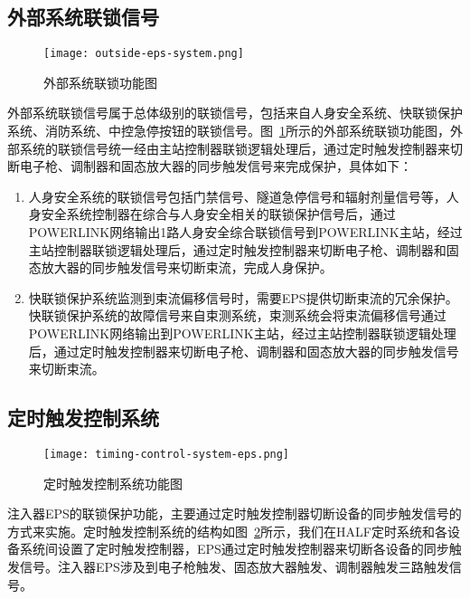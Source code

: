 \subsection{外部系统联锁信号}

\begin{figure}[!htb]
	\centering
	\texttt{[image: outside-eps-system.png]}
	\caption{外部系统联锁功能图}
	\label{fig:outside-eps-system}
\end{figure}

外部系统联锁信号属于总体级别的联锁信号，包括来自人身安全系统、快联锁保护系统、消防系统、中控急停按钮的联锁信号。图~\ref{fig:outside-eps-system}所示的外部系统联锁功能图，外部系统的联锁信号统一经由主站控制器联锁逻辑处理后，通过定时触发控制器来切断电子枪、调制器和固态放大器的同步触发信号来完成保护，具体如下：

\begin{enumerate}
  \item 人身安全系统的联锁信号包括门禁信号、隧道急停信号和辐射剂量信号等，人身安全系统控制器在综合与人身安全相关的联锁保护信号后，通过POWERLINK网络输出1路人身安全综合联锁信号到POWERLINK主站，经过主站控制器联锁逻辑处理后，通过定时触发控制器来切断电子枪、调制器和固态放大器的同步触发信号来切断束流，完成人身保护。

  \item 快联锁保护系统监测到束流偏移信号时，需要EPS提供切断束流的冗余保护。快联锁保护系统的故障信号来自束测系统，束测系统会将束流偏移信号通过POWERLINK网络输出到POWERLINK主站，经过主站控制器联锁逻辑处理后，通过定时触发控制器来切断电子枪、调制器和固态放大器的同步触发信号来切断束流。
\end{enumerate}

\subsection{定时触发控制系统}

\begin{figure}[!htb]
	\centering
	\texttt{[image: timing-control-system-eps.png]}
	\caption{定时触发控制系统功能图}
	\label{fig:timing-control-system-eps}
\end{figure}

注入器EPS的联锁保护功能，主要通过定时触发控制器切断设备的同步触发信号的方式来实施。定时触发控制系统的结构如图~\ref{fig:timing-control-system-eps}所示，我们在HALF定时系统和各设备系统间设置了定时触发控制器，EPS通过定时触发控制器来切断各设备的同步触发信号。注入器EPS涉及到电子枪触发、固态放大器触发、调制器触发三路触发信号。

